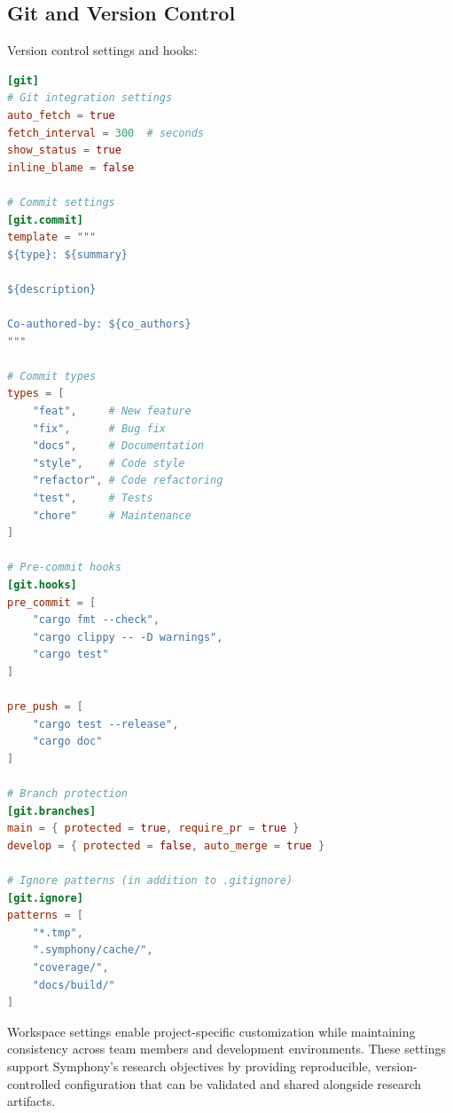 \subsection*{Git and Version Control}

Version control settings and hooks:

\begin{lstlisting}[language=toml,caption={Git Configuration}]
[git]
# Git integration settings
auto_fetch = true
fetch_interval = 300  # seconds
show_status = true
inline_blame = false

# Commit settings
[git.commit]
template = """
${type}: ${summary}

${description}

Co-authored-by: ${co_authors}
"""

# Commit types
types = [
    "feat",     # New feature
    "fix",      # Bug fix
    "docs",     # Documentation
    "style",    # Code style
    "refactor", # Code refactoring
    "test",     # Tests
    "chore"     # Maintenance
]

# Pre-commit hooks
[git.hooks]
pre_commit = [
    "cargo fmt --check",
    "cargo clippy -- -D warnings",
    "cargo test"
]

pre_push = [
    "cargo test --release",
    "cargo doc"
]

# Branch protection
[git.branches]
main = { protected = true, require_pr = true }
develop = { protected = false, auto_merge = true }

# Ignore patterns (in addition to .gitignore)
[git.ignore]
patterns = [
    "*.tmp",
    ".symphony/cache/",
    "coverage/",
    "docs/build/"
]
\end{lstlisting}

Workspace settings enable project-specific customization while maintaining consistency across team members and development environments. These settings support Symphony's research objectives by providing reproducible, version-controlled configuration that can be validated and shared alongside research artifacts.
